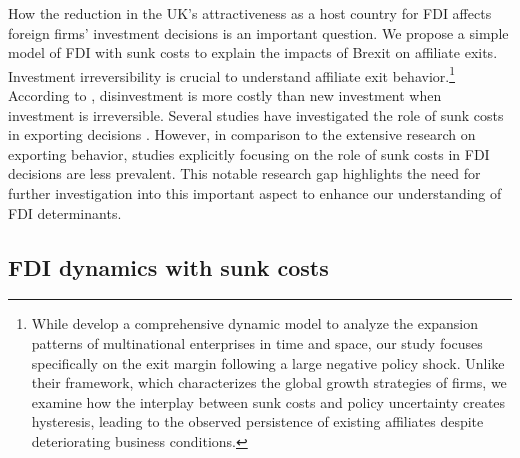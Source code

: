 \documentclass[preprint,11pt,authoryear]{elsarticle}
\begin{document}
How the reduction in the UK's attractiveness as a host country for FDI affects foreign firms' investment decisions is an important question. 
We propose a simple model of FDI with sunk costs to explain the impacts of Brexit on affiliate exits.
Investment irreversibility is crucial to understand affiliate exit behavior.\footnote{While \cite{garetto2019} develop a comprehensive dynamic model to analyze the expansion patterns of multinational enterprises in time and space, our study focuses specifically on the exit margin following a large negative policy shock. Unlike their framework, which characterizes the global growth strategies of firms, we examine how the interplay between sunk costs and policy uncertainty creates hysteresis, leading to the observed persistence of existing affiliates despite deteriorating business conditions.}
According to \cite{kim2017asset}, disinvestment is more costly than new investment when investment is irreversible.
Several studies have investigated the role of sunk costs in exporting decisions \citep{roberts1997decision,das2007market,handley2015trade,graziano2021brexit}. However, in comparison to the extensive research on exporting behavior, studies explicitly focusing on the role of sunk costs in FDI decisions are less prevalent. This notable research gap highlights the need for further investigation into this important aspect to enhance our understanding of FDI determinants.

\subsection{FDI dynamics with sunk costs}
\end{document}
